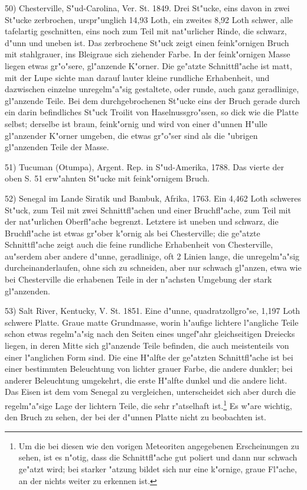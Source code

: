 \documentclass[a4paper, 11pt, oneside, german]{article}
\begin{document}
50) Chesterville, S"ud-Carolina, Ver. St. 1849. Drei St"ucke, eins davon in zwei St"ucke zerbrochen, urspr"unglich 14,93 Loth, ein zweites 8,92 Loth schwer, alle tafelartig geschnitten, eins noch zum Teil mit nat"urlicher Rinde, die schwarz, d"unn und uneben ist. Das zerbrochene St"uck zeigt einen feink"ornigen Bruch mit stahlgrauer, ins Bleigraue sich ziehender Farbe. In der feink"ornigen Masse liegen etwas gr"o"sere, gl"anzende K"orner. Die ge"atzte Schnittfl"ache ist matt, mit der Lupe sichte man darauf lauter kleine rundliche Erhabenheit, und dazwischen einzelne unregelm"a"sig gestaltete, oder runde, auch ganz geradlinige, gl"anzende Teile. Bei dem durchgebrochenen St"ucke eins der Bruch gerade durch ein darin befindliches St"uck Troilit von Haselnussgro"ssen, so dick wie die Platte selbst; derselbe ist braun, feink"ornig und wird von einer d"unnen H"ulle gl"anzender K"orner umgeben, die etwas gr"o"ser sind als die "ubrigen gl"anzenden Teile der Masse.

51) Tucuman (Otumpa), Argent. Rep. in S"ud-Amerika, 1788. Das vierte der oben S. 51 erw"ahnten St"ucke mit feink"ornigem Bruch.

52) Senegal im Lande Siratik und Bambuk, Afrika, 1763. Ein 4,462 Loth schweres St"uck, zum Teil mit zwei Schnittfl"achen und einer Bruchfl"ache, zum Teil mit der nat"urlichen Oberfl"ache begrenzt. Letztere ist uneben und schwarz, die Bruchfl"ache ist etwas gr"ober k"ornig als bei Chesterville; die ge"atzte Schnittfl"ache zeigt auch die feine rundliche Erhabenheit von Chesterville, au"serdem aber andere d"unne, geradlinige, oft 2 Linien lange, die unregelm"a"sig durcheinanderlaufen, ohne sich zu schneiden, aber nur schwach gl"anzen, etwa wie bei Chesterville die erhabenen Teile in der n"achsten Umgebung der stark gl"anzenden.

53) Salt River, Kentucky, V. St. 1851. Eine d"unne, quadratzollgro"se, 1,197 Loth schwere Platte. Graue matte Grundmasse, worin h"aufige lichtere l"angliche Teile schon etwas regelm"a"sig nach den Seiten eines ungef"ahr gleichseitigen Dreiecks liegen, in deren Mitte sich gl"anzende Teile befinden, die auch meistenteils von einer l"anglichen Form sind. Die eine H"alfte der ge"atzten Schnittfl"ache ist bei einer bestimmten Beleuchtung von lichter grauer Farbe, die andere dunkler; bei anderer Beleuchtung umgekehrt, die erste H"alfte dunkel und die andere licht. Das Eisen ist dem vom Senegal zu vergleichen, unterscheidet sich aber durch die regelm"a"sige Lage der lichtern Teile, die sehr r"atselhaft ist.\footnote{Um die bei diesen wie den vorigen Meteoriten angegebenen Erscheinungen zu sehen, ist es n"otig, dass die Schnittfl"ache gut poliert und dann nur schwach ge"atzt wird; bei starker "atzung bildet sich nur eine k"ornige, graue Fl"ache, an der nichts weiter zu erkennen ist.} Es w"are wichtig, den Bruch zu sehen, der bei der d"unnen Platte nicht zu beobachten ist.
\end{document}
